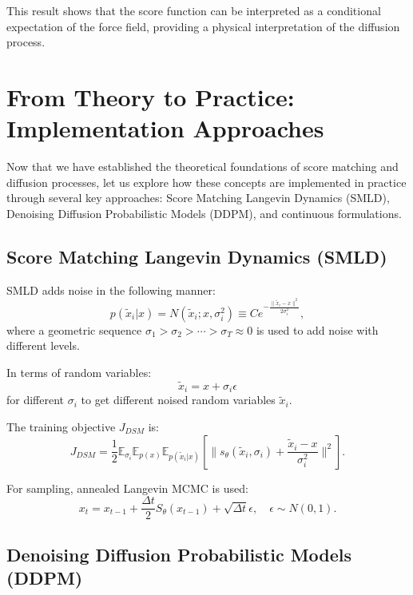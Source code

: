 This result shows that the score function can be interpreted as a conditional expectation of the force field, providing a physical interpretation of the diffusion process.

\section{From Theory to Practice: Implementation Approaches}

Now that we have established the theoretical foundations of score matching and diffusion processes, let us explore how these concepts are implemented in practice through several key approaches: Score Matching Langevin Dynamics (SMLD), Denoising Diffusion Probabilistic Models (DDPM), and continuous formulations.

\subsection{Score Matching Langevin Dynamics (SMLD)}

SMLD adds noise in the following manner:
\begin{equation}
p(\tilde{x}_i| x) = N(\tilde{x}_i; x, \sigma_i^2) \equiv Ce^{-\frac{\|\tilde{x}_i-x\|^2}{2\sigma_i^2}},
\end{equation}
where a geometric sequence $\sigma_1 > \sigma_2 > \cdots > \sigma_T \approx 0$ is used to add noise with different levels.

In terms of random variables:
\begin{equation}
\tilde{x}_i = x + \sigma_i \epsilon
\end{equation}
for different $\sigma_i$ to get different noised random variables $\tilde{x}_i$.

The training objective $J_{DSM}$ is:
\begin{equation}
J_{DSM} = \frac{1}{2}\mathbb{E}_{\sigma_i}\mathbb{E}_{p(x)}\mathbb{E}_{p(\tilde{x}_i|x)}\left[\|s_\theta(\tilde{x}_i,\sigma_i) + \frac{\tilde{x}_i-x}{\sigma_i^2}\|^2\right].
\end{equation}

For sampling, annealed Langevin MCMC is used:
\begin{equation}
x_t = x_{t-1} + \frac{\Delta t}{2}S_\theta(x_{t-1}) + \sqrt{\Delta t}\epsilon, \quad \epsilon \sim N(0,1).
\end{equation}

\subsection{Denoising Diffusion Probabilistic Models (DDPM)}

